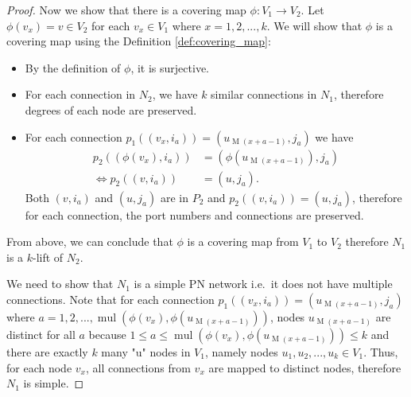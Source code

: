 \begin{proof}
    Now we show that there is a covering map $\phi: V_1 \rightarrow V_2$.
    Let $\phi(v_x) = v \in V_2$ for each $v_x \in V_1$ where $x=1, 2, ..., k$.
    We will show that $\phi$ is a covering map using the Definition \ref{def:covering_map}:
    \begin{itemize}
        \item By the definition of $\phi$, it is surjective.
        \item For each connection in $N_2$, we have $k$ similar connections in $N_1$, therefore degrees of each node are preserved.
        \item For each connection $p_1((v_{x}, i_a)) = (u_{\operatorname{M}(x+a-1)}, j_a)$ we have
        \begin{align*}
           p_2((\phi(v_{x}), i_a)) &= (\phi(u_{\operatorname{M}(x+a-1)}), j_a)\\
           \Leftrightarrow p_2((v, i_a)) &= (u, j_a).
        \end{align*}
        Both $(v, i_a)$ and $(u, j_a)$ are in $P_2$ and $p_2((v, i_a)) = (u, j_a)$, therefore for each connection, the port numbers and connections are preserved.
    \end{itemize}
    From above, we can conclude that $\phi$ is a covering map from $V_1$ to $V_2$
    therefore $N_1$ is a $k$-lift of $N_2$.

    We need to show that $N_1$ is a simple PN network i.e.\ it does not have multiple connections.
    Note that for each connection $p_1((v_{x}, i_a)) = (u_{\operatorname{M}(x+a-1)}, j_a)$ where $a=1, 2, ..., \operatorname{mul}(\phi(v_{x}),\phi(u_{\operatorname{M}(x+a-1)}))$, nodes $u_{\operatorname{M}(x+a-1)}$ are distinct for all $a$ because $1 \leq a \leq \operatorname{mul}(\phi(v_{x}),\phi(u_{\operatorname{M}(x+a-1)})) \leq k$ and
    there are exactly $k$ many "u" nodes in $V_1$, namely nodes $u_1, u_2, ..., u_k \in V_1$.
    Thus, for each node $v_x$, all connections from $v_x$ are mapped to distinct nodes, therefore $N_1$ is simple.


\end{proof}
